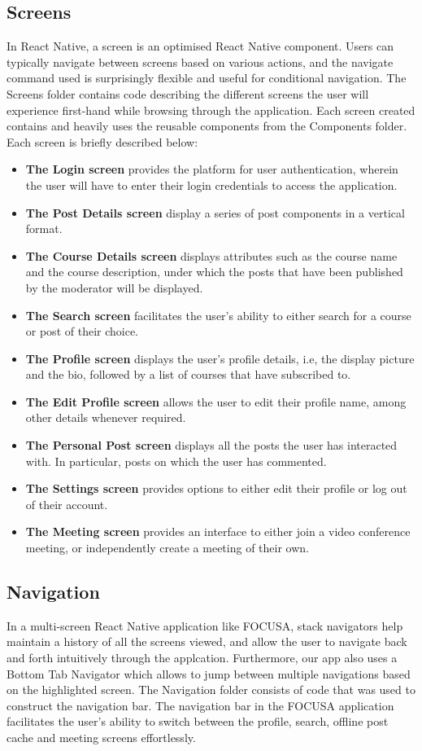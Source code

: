 \subsection{Screens}
In React Native, a screen is an optimised React Native component. Users can typically navigate between screens based on various actions, 
and the navigate command used is surprisingly flexible and useful for conditional navigation.
The Screens folder contains code describing the different screens the user will experience first-hand while browsing through the application. 
Each screen created contains and heavily uses the reusable components from the Components folder. Each screen is briefly described below: 
\begin{itemize}
    \item \textbf{The Login screen} provides the platform for user authentication, wherein the user will have to enter their login credentials 
    to access the application. 
    \item \textbf{The Post Details screen} display a series of post components in a vertical format.
    \item \textbf{The Course Details screen} displays attributes such as the course name and the course description, under which the posts 
    that have been published by the moderator will be displayed. 
    \item \textbf{The Search screen} facilitates the user's ability to either search for a course or post of their choice.
    \item \textbf{The Profile screen} displays the user's profile details, i.e, the display picture and the bio, 
    followed by a list of courses that have subscribed to.
    \item \textbf{The Edit Profile screen} allows the user to edit their profile name, among other details whenever required.
    \item \textbf{The Personal Post screen} displays all the posts the user has interacted with. In particular, posts on which the user has commented.
    \item \textbf{The Settings screen} provides options to either edit their profile or log out of their account.
    \item \textbf{The Meeting screen} provides an interface to either join a video conference meeting, or independently create a meeting of their own.
\end{itemize}

\subsection{Navigation}
In a multi-screen React Native application like FOCUSA, stack navigators help maintain a history of all the screens viewed, 
and allow the user to navigate back and forth intuitively through the applcation. Furthermore, our app also uses a Bottom Tab 
Navigator which allows to jump between multiple navigations based on the highlighted screen.
The Navigation folder consists of code that was used to construct the navigation bar. 
The navigation bar in the FOCUSA application facilitates the user's ability to switch 
between the profile, search, offline post cache and meeting screens effortlessly.

